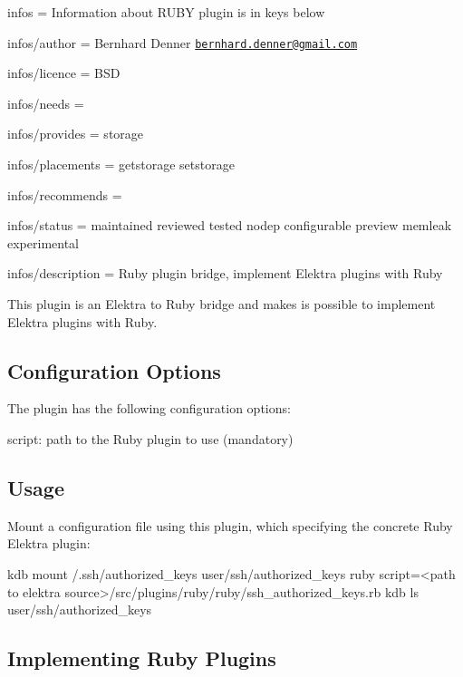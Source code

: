 
\begin{DoxyItemize}
\item infos = Information about R\+U\+BY plugin is in keys below
\item infos/author = Bernhard Denner \href{mailto:bernhard.denner@gmail.com}{\tt bernhard.\+denner@gmail.\+com}
\item infos/licence = B\+SD
\item infos/needs =
\item infos/provides = storage
\item infos/placements = getstorage setstorage
\item infos/recommends =
\item infos/status = maintained reviewed tested nodep configurable preview memleak experimental
\item infos/description = Ruby plugin bridge, implement Elektra plugins with Ruby
\end{DoxyItemize}

This plugin is an Elektra to Ruby bridge and makes is possible to implement Elektra plugins with Ruby.

\subsection*{Configuration Options}

The plugin has the following configuration options\+:


\begin{DoxyItemize}
\item {\ttfamily script}\+: path to the Ruby plugin to use (mandatory)
\end{DoxyItemize}

\subsection*{Usage}

Mount a configuration file using this plugin, which specifying the concrete Ruby Elektra plugin\+:


\begin{DoxyCode}
kdb mount /.ssh/authorized\_keys user/ssh/authorized\_keys ruby script=<path to elektra
source>/src/plugins/ruby/ruby/ssh\_authorized\_keys.rb
kdb ls user/ssh/authorized\_keys
\end{DoxyCode}


\subsection*{Implementing Ruby Plugins}

